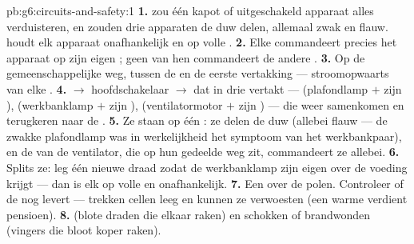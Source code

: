 \begin{solution}{pb:g6:circuits-and-safety:1}
\textbf{1.}  zou één kapot of uitgeschakeld apparaat alles
verduisteren, en zouden drie apparaten de duw delen, allemaal zwak en
flauw.  houdt elk apparaat onafhankelijk en op volle .
\textbf{2.} Elke  commandeert precies het apparaat op zijn
eigen ; geen van hen commandeert de andere .
\textbf{3.} Op de gemeenschappelijke weg, tussen de  en de
eerste vertakking --- stroomopwaarts van elke .
\textbf{4.}  $\to$ hoofdschakelaar $\to$  dat
in drie  vertakt --- (plafondlamp $+$ zijn
), (werkbanklamp $+$ zijn ),
(ventilatormotor $+$ zijn ) --- die weer samenkomen en
terugkeren naar de .
\textbf{5.} Ze staan  op één : ze delen de duw
(allebei flauw --- de zwakke plafondlamp was in werkelijkheid het
symptoom van het werkbankpaar), en de  van de ventilator,
die op hun gedeelde weg zit, commandeert ze allebei.
\textbf{6.} Splits ze: leg één nieuwe draad zodat de werkbanklamp zijn
eigen  over de voeding krijgt --- dan is elk op volle  en
onafhankelijk.
\textbf{7.} Een  over de polen. Controleer of de
 nog levert ---  trekken cellen leeg en kunnen
ze verwoesten (een warme  verdient pensioen).
\textbf{8.}  (blote draden die elkaar raken) en
schokken of brandwonden (vingers die bloot koper raken).

\end{solution}
